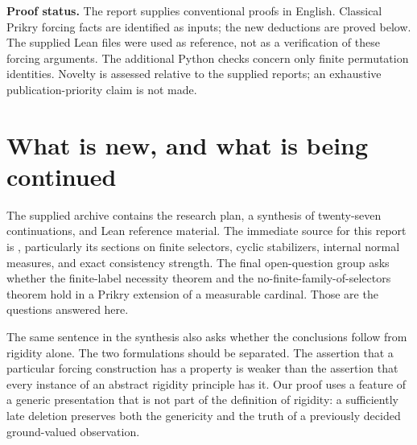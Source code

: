 \documentclass[11pt,letterpaper]{article}
\theoremstyle{definition}
\numberwithin{equation}{section}
\begin{document}
\textbf{Proof status.}
The report supplies conventional proofs in English. Classical Prikry forcing
facts are identified as inputs; the new deductions are proved below.
The supplied Lean files were used as reference, not as a verification of
these forcing arguments. The additional Python checks concern only finite
permutation identities. Novelty is assessed relative to the supplied
reports; an exhaustive publication-priority claim is not made.

\newpage
\tableofcontents

\section{What is new, and what is being continued}\label{sec:scope}

The supplied archive contains the research plan, a synthesis of twenty-seven
continuations, and Lean reference material. The immediate source for this
report is \cite{archive}, particularly its sections on finite selectors,
cyclic stabilizers, internal normal measures, and exact consistency strength.
The final open-question group asks whether the finite-label necessity theorem
and the no-finite-family-of-selectors theorem hold in a Prikry extension of a
measurable cardinal. Those are the questions answered here.

The same sentence in the synthesis also asks whether the conclusions follow
from rigidity alone. The two formulations should be separated. The assertion
that a particular forcing construction has a property is weaker than the
assertion that every instance of an abstract rigidity principle has it. Our
proof uses a feature of a generic presentation that is not part of the
definition of rigidity: a sufficiently late deletion preserves both the
genericity and the truth of a previously decided ground-valued observation.
\end{document}
